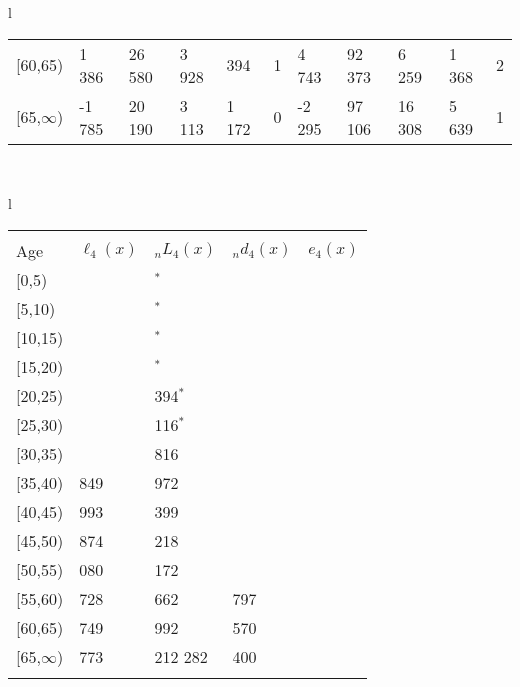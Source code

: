 \documentclass[
]{article}
\begin{document}
\begin{table}
\begin{tabular}[t]{l}
\begin{tabular}
{}[60,65) & 1 386 & 26 580 & 3 928 & 394 & 1 & 4 743 & 92 373 & 6 259 & 1 368 & 2\\
{}[65,$\infty$) & -1 785 & 20 190 & 3 113 & 1 172 & 0 & -2 295 & 97 106 & 16 308 & 5 639 & 1\\
\end{tabular}\\
\end{tabular}
\centering
\begin{tabular}[t]{l}
\hline
\begin{tabular}{>{\raggedright\arraybackslash}p{.43in}>{\raggedleft\arraybackslash}p{1.3in}>{\raggedleft\arraybackslash}p{1.3in}>{\raggedleft\arraybackslash}p{1.3in}>{\raggedleft\arraybackslash}p{1.3in}}
\toprule
\multicolumn{1}{c}{ } & \multicolumn{4}{c}{(4) Lost both} \\
\cmidrule(l{3pt}r{3pt}){2-5}
Age & $\ell_{4}(x)$ & ${}_nL_{4}(x)$ & ${}_nd_{4}(x)$ & $e_{4}(x)$\\
\midrule
{}[0,5) & 0 & 0$^{*}$ & 0 & 18\\
{}[5,10) & 0 & 0$^{*}$ & 0 & 18\\
{}[10,15) & 0 & 391$^{*}$ & 0 & 18\\
{}[15,20) & 391 & 472$^{*}$ & 0 & 18\\
{}[20,25) & 390 & 1 394$^{*}$ & 2 & 18\\
\addlinespace
{}[25,30) & 389 & 1 116$^{*}$ & 2 & 18\\
{}[30,35) & 984 & 4 816 & 12 & 18\\
{}[35,40) & 1 849 & 6 972 & 20 & 19\\
{}[40,45) & 2 993 & 14 399 & 50 & 19\\
{}[45,50) & 3 874 & 47 218 & 218 & 19\\
\addlinespace
{}[50,55) & 9 080 & 87 172 & 586 & 19\\
{}[55,60) & 16 728 & 176 662 & 1 797 & 19\\
{}[60,65) & 24 749 & 240 992 & 3 570 & 17\\
{}[65,$\infty$) & 31 773 & 1 212 282 & 70 400 & 16\\
\bottomrule
\multicolumn{5}{l}{\rule{0pt}{1em}\textsuperscript{*} Based on an estimated from SIPP with less than 10 respondents in the numerator.}\\
\end{tabular}\\
\end{tabular}
\end{table}
\end{document}
